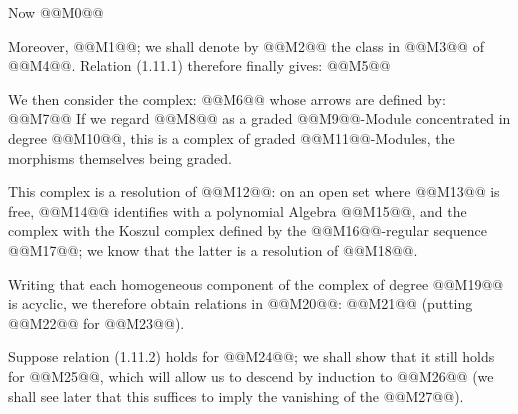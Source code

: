 Now
@@M0@@

Moreover, @@M1@@; we shall denote by @@M2@@ the class in @@M3@@ of @@M4@@. Relation (1.11.1) therefore finally gives:
@@M5@@

We then consider the complex:
@@M6@@
whose arrows are defined by:
@@M7@@
If we regard @@M8@@ as a graded @@M9@@-Module concentrated in degree @@M10@@, this is a complex of graded @@M11@@-Modules, the morphisms themselves being graded.

This complex is a resolution of @@M12@@: on an open set where @@M13@@ is free, @@M14@@ identifies with a polynomial Algebra @@M15@@, and the complex with the Koszul complex defined by the @@M16@@-regular sequence @@M17@@; we know that the latter is a resolution of @@M18@@.

Writing that each homogeneous component of the complex of degree @@M19@@ is acyclic, we therefore obtain relations in @@M20@@:
@@M21@@
(putting @@M22@@ for @@M23@@).

Suppose relation (1.11.2) holds for @@M24@@; we shall show that it still holds for @@M25@@, which will allow us to descend by induction to @@M26@@ (we shall see later that this suffices to imply the vanishing of the @@M27@@).

